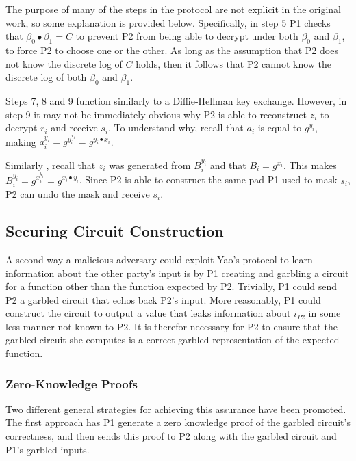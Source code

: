 The purpose of many of the steps in the protocol are not explicit in the original work\cite{bellare1990non}, so some explanation is provided below.  Specifically, in step 5 \ac{P1} checks that $\beta_0 \bullet \beta_1 = C$ to prevent \ac{P2} from being able to decrypt under both $\beta_0$ and $\beta_1$, to force \ac{P2} to choose one or the other. As long as the assumption that \ac{P2} does not know the discrete log of $C$ holds, then it follows that \ac{P2} cannot know the discrete log of both $\beta_0$ and $\beta_1$.

Steps 7, 8 and 9 function similarly to a Diffie-Hellman key exchange.  However, in step 9 it may not be immediately obvious why \ac{P2} is able to reconstruct $z_i$ to decrypt $r_i$ and receive $s_i$.  To understand why, recall that $a_i$ is equal to $g^{y_i}$, making $a^{y_i}_i = g^{y^{x_i}_i} = g^{y_i \bullet x_i}$.

Similarly , recall that $z_i$ was generated from $B^{y_i}_i$ and that $B_i = g^{x_i}$.  This makes $B^{y_i}_i = g^{x^{y_i}_i} = g^{x_i \bullet y_i}$.  Since \ac{P2} is able to construct the same pad \ac{P1} used to mask $s_i$, \ac{P2} can undo the mask and receive $s_i$.


\subsection{Securing Circuit Construction}
\label{sec:securingcircuits}

A second way a malicious adversary could exploit Yao's protocol to learn information about the other party's input is by \ac{P1} creating and garbling a circuit for a function other than the function expected by \ac{P2}. Trivially, \ac{P1} could send \ac{P2} a garbled circuit that echos back \ac{P2}'s input.  More reasonably, \ac{P1} could construct the circuit to output a value that leaks information about $i_{P2}$ in some less manner not known to \ac{P2}.  It is therefor necessary for \ac{P2} to ensure that the garbled circuit she computes is a correct garbled representation of the expected function.

\subsubsection{Zero-Knowledge Proofs}

Two different general strategies for achieving this assurance have been promoted.  The first approach has \ac{P1} generate a zero knowledge proof of the garbled circuit's correctness, and then sends this proof to \ac{P2} along with the garbled circuit and \ac{P1}'s garbled inputs\cite{goldreich1987play, goldreich2009foundations}.

